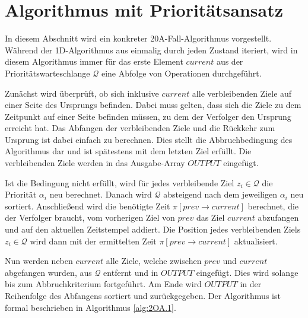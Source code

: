 \documentclass[german,version-2019-11]{uzl-thesis}
\begin{document}
\section{Algorithmus mit Prioritätsansatz}

In diesem Abschnitt wird ein konkreter 20A-Fall-Algorithmus vorgestellt. Während der 1D-Algorithmus aus \cite{helvig} einmalig durch jeden Zustand iteriert, wird in diesem Algorithmus immer für das erste Element $current$ aus der Prioritätswarteschlange $\mathcal{Q}$ eine Abfolge von Operationen durchgeführt. 

Zunächst wird überprüft, ob sich inklusive $current$ alle verbleibenden Ziele auf einer Seite des Ursprungs befinden. Dabei muss gelten, dass sich die Ziele zu dem Zeitpunkt auf einer Seite befinden müssen, zu dem der Verfolger den Ursprung erreicht hat. Das Abfangen der verbleibenden Ziele und die Rückkehr zum Ursprung ist dabei einfach zu berechnen. Dies stellt die Abbruchbedingung des Algorithmus dar und ist spätestens mit dem letzten Ziel erfüllt. Die verbleibenden Ziele werden in das Ausgabe-Array $OUTPUT$ eingefügt. 

Ist die Bedingung nicht erfüllt, wird für jedes verbleibende Ziel $z_i\in \mathcal{Q}$ die Priorität $\alpha_i$ neu berechnet. Danach wird $\mathcal{Q}$ absteigend nach dem jeweiligen $\alpha_i$ neu sortiert. Anschließend wird die benötigte Zeit $\pi[prev\rightarrow current]$ berechnet, die der Verfolger braucht, vom vorherigen Ziel von $prev$ das Ziel $current$ abzufangen und auf den aktuellen Zeitstempel addiert. Die Position jedes verbleibenden Ziels $z_i\in \mathcal{Q}$ wird dann mit der ermittelten Zeit $\pi[prev\rightarrow current]$ aktualisiert.

Nun werden neben $current$ alle Ziele, welche zwischen $prev$ und $current$ abgefangen wurden, aus $\mathcal{Q}$ entfernt und in $OUTPUT$ eingefügt. Dies wird solange bis zum Abbruchkriterium fortgeführt. Am Ende wird $OUTPUT$ in der Reihenfolge des Abfangens sortiert und zurückgegeben. Der Algorithmus ist formal beschrieben in Algorithmus \ref{alg:2OA.1}.
\end{document}
